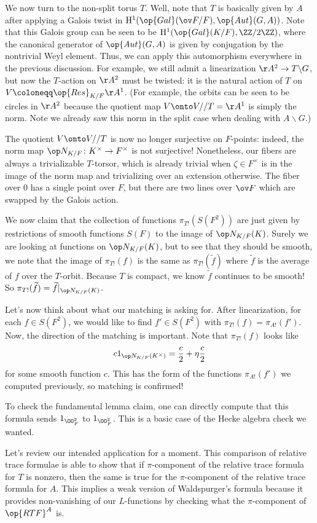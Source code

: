 \documentclass[../notes.tex]{subfiles}
\begin{document}
We now turn to the non-split torus $T$. Well, note that $T$ is basically given by $A$ after applying a Galois twist in $\mathrm H^1(\op{Gal}(\ov F/F),\op{Aut}(G,A))$. Note that this Galois group can be seen to be $\mathrm H^1(\op{Gal}(K/F),\ZZ/2\ZZ)$, where the canonical generator of $\op{Aut}(G,A)$ is given by conjugation by the nontrivial Weyl element. Thus, we can apply this automorphism everywhere in the previous discussion. For example, we still admit a linearization $\AA^2\to T\backslash G$, but now the $T$-action on $\AA^2$ must be twisted: it is the natural action of $T$ on $V\coloneqq\op{Res}_{K/F}\AA^1$. (For example, the orbits can be seen to be circles in $\AA^2$ because the quotient map $V\onto V//T=\AA^1$ is simply the norm. Note we already saw this norm in the split case when dealing with $A\backslash G$.)
\begin{remark}
	The quotient $V\onto V//T$ is now no longer surjective on $F$-points: indeed, the norm map $\op N_{K/F}\colon K^\times\to F^\times$ is not surjective! Nonetheless, our fibers are always a trivializable $T$-torsor, which is already trivial when $\zeta\in F^\times$ is in the image of the norm map and trivializing over an extension otherwise. The fiber over $0$ has a single point over $F$, but there are two lines over $\ov F$ which are swapped by the Galois action.
\end{remark}
We now claim that the collection of functions $\pi_{T!}(S(F^2))$ are just given by restrictions of smooth functions $S(F)$ to the image of $\op N_{K/F}(K)$. Surely we are looking at functions on $\op N_{K/F}(K)$, but to see that they should be smooth, we note that the image of $\pi_{T!}(f)$ is the same as $\pi_{T!}(\widetilde f)$ where $\widetilde f$ is the average of $f$ over the $T$-orbit. Because $T$ is compact, we know $\widetilde f$ continues to be smooth! So $\pi_{T!}(\widetilde f)=\widetilde f|_{\op N_{K/F}(K)}$.

Let's now think about what our matching is asking for. After linearization, for each $f\in S(F^2)$, we would like to find $f'\in S(F^2)$ with $\pi_{T!}(f)=\pi_{A!}(f')$. Now, the direction of the matching is important. Note that $\pi_{T!}(f)$ looks like
\[c1_{\op N_{K/F}(K^\times)}=\frac c2+\eta\frac c2\]
for some smooth function $c$. This has the form of the functions $\pi_{A!}(f')$ we computed previously, so matching is confirmed!
\begin{remark}
	To check the fundamental lemma claim, one can directly compute that this formula sends $1_{\OO_F^2}$ to $1_{\OO_F^2}$. This is a basic case of the Hecke algebra check we wanted.
\end{remark}
Let's review our intended application for a moment. This comparison of relative trace formulae is able to show that if $\pi$-component of the relative trace formula for $T$ is nonzero, then the same is true for the $\pi$-component of the relative trace formula for $A$. This implies a weak version of Waldspurger's formula because it provides non-vanishing of our $L$-functions by checking what the $\pi$-component of $\op{RTF}^A$ is.
\end{document}
